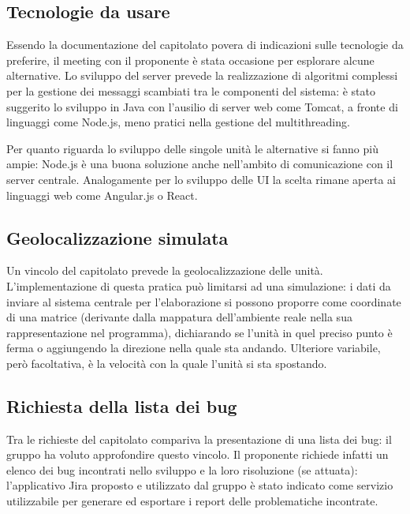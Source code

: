 \subsection{Tecnologie da usare}
Essendo la documentazione del capitolato povera di indicazioni sulle tecnologie da preferire, il meeting con il proponente è stata occasione per esplorare alcune alternative. 
Lo sviluppo del server prevede la realizzazione di algoritmi complessi per la gestione dei messaggi scambiati tra le componenti del sistema: è stato suggerito lo sviluppo in Java con l'ausilio di server web come Tomcat, a fronte di linguaggi come Node.js, meno pratici nella gestione del multithreading.
 
Per quanto riguarda lo sviluppo delle singole unità le alternative si fanno più ampie: Node.js è una buona soluzione anche nell'ambito di comunicazione con il server centrale.
Analogamente per lo sviluppo delle UI la scelta rimane aperta ai linguaggi web come Angular.js o React.

\subsection{Geolocalizzazione simulata}

Un vincolo del capitolato prevede la geolocalizzazione delle unità. L'implementazione di questa pratica può limitarsi ad una simulazione: i dati da inviare al sistema centrale per l'elaborazione si possono proporre come coordinate di una matrice (derivante dalla mappatura dell'ambiente reale nella sua rappresentazione nel programma), dichiarando se l'unità in quel preciso punto è ferma o aggiungendo la direzione nella quale sta andando. Ulteriore variabile, però facoltativa, è la velocità con la quale l'unità si sta spostando. 

\subsection{Richiesta della lista dei bug}
Tra le richieste del capitolato compariva la presentazione di una lista dei bug: il gruppo ha voluto approfondire questo vincolo. Il proponente richiede infatti un elenco dei bug incontrati nello sviluppo e la loro risoluzione (se attuata): l'applicativo Jira proposto e utilizzato dal gruppo è stato indicato come servizio utilizzabile per generare ed esportare i report delle problematiche incontrate.

